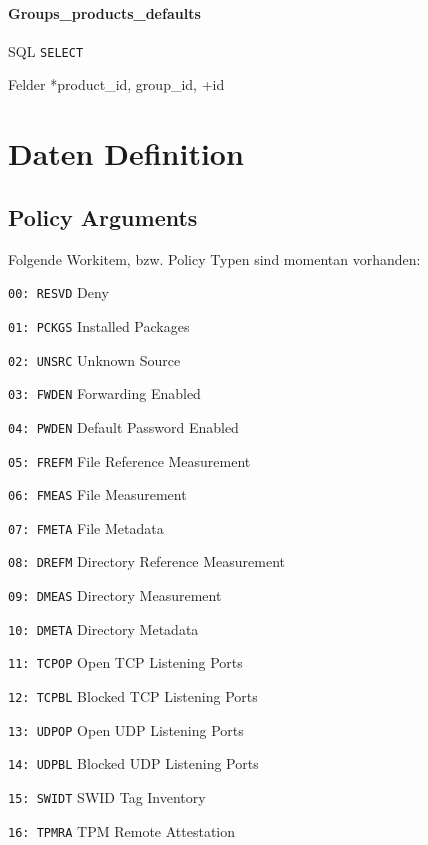 \documentclass[10pt,a4paper]{scrartcl}
\begin{document}
\paragraph{Groups\_products\_defaults}
\begin{description*}
	\item[SQL] \texttt{SELECT}
	\item[Felder] *product\_id, group\_id, +id
\end{description*} 

\pagebreak
\section{Daten Definition}

\subsection{Policy Arguments}

Folgende Workitem, bzw. Policy Typen sind momentan vorhanden:
\begin{description*}
	\item[\texttt{00: RESVD}] Deny
	\item[\texttt{01: PCKGS}] Installed Packages
	\item[\texttt{02: UNSRC}] Unknown Source
	\item[\texttt{03: FWDEN}] Forwarding Enabled
	\item[\texttt{04: PWDEN}] Default Password Enabled
	\item[\texttt{05: FREFM}] File Reference Measurement
	\item[\texttt{06: FMEAS}] File Measurement 
	\item[\texttt{07: FMETA}] File Metadata
	\item[\texttt{08: DREFM}] Directory Reference Measurement
	\item[\texttt{09: DMEAS}] Directory Measurement
	\item[\texttt{10: DMETA}] Directory Metadata
	\item[\texttt{11: TCPOP}] Open TCP Listening Ports
	\item[\texttt{12: TCPBL}] Blocked TCP Listening Ports
	\item[\texttt{13: UDPOP}] Open UDP Listening Ports
	\item[\texttt{14: UDPBL}] Blocked UDP Listening Ports
	\item[\texttt{15: SWIDT}] SWID Tag Inventory
	\item[\texttt{16: TPMRA}] TPM Remote Attestation
\end{description*}
\end{document}
